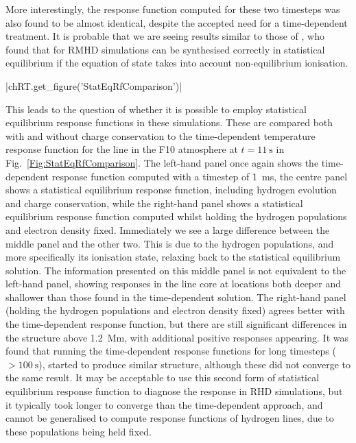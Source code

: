 More interestingly, the \Ha{} response function computed for these two timesteps was also found to be almost identical, despite the accepted need for a time-dependent treatment.
It is probable that we are seeing results similar to those of \citet{Leenaarts2012a}, who found that for RMHD simulations \Ha{} can be synthesised correctly in statistical equilibrium if the equation of state takes into account non-equilibrium ionisation.

\py[TimeDepRT]|chRT.get_figure('StatEqRfComparison')|

This leads to the question of whether it is possible to employ statistical equilibrium response functions in these simulations.
These are compared both with and without charge conservation to the time-dependent temperature response function for the \CaLine{} line in the F10 atmosphere at $t=\SI{11}{\s}$ in Fig.~\ref{Fig:StatEqRfComparison}.
The left-hand panel once again shows the time-dependent response function computed with a timestep of \SI{1}{\milli\s}, the centre panel shows a statistical equilibrium response function, including hydrogen evolution and charge conservation, while the right-hand panel shows a statistical equilibrium response function computed whilst holding the hydrogen populations and electron density fixed.
Immediately we see a large difference between the middle panel and the other two.
This is due to the hydrogen populations, and more specifically its ionisation state, relaxing back to the statistical equilibrium solution.
The information presented on this middle panel is not equivalent to the left-hand panel, showing responses in the line core at locations both deeper and shallower than those found in the time-dependent solution.
The right-hand panel (holding the hydrogen populations and electron density fixed) agrees better with the time-dependent response function, but there are still significant differences in the structure above \SI{1.2}{\mega\metre}, with additional positive responses appearing.
It was found that running the time-dependent response functions for long timesteps ($>\SI{100}{\s}$), started to produce similar structure, although these did not converge to the same result.
It may be acceptable to use this second form of statistical equilibrium response function to diagnose the \CaLine{} response in RHD simulations, but it typically took longer to converge than the time-dependent approach, and cannot be generalised to compute response functions of hydrogen lines, due to these populations being held fixed.

